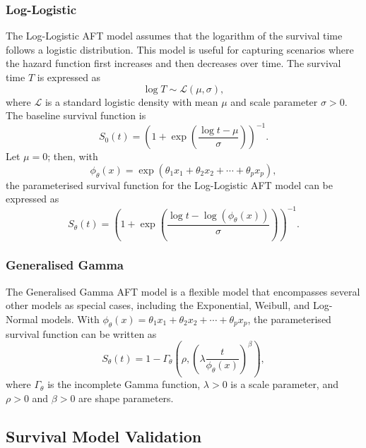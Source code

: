 
\subsubsection{Log-Logistic}
The Log-Logistic AFT model assumes that the logarithm of the survival time follows a logistic distribution. This model is useful for capturing scenarios where the hazard function first increases and then decreases over time. The survival time $T$ is expressed as
\[ %
    \log T \sim \mathcal{L}(\mu, \sigma),
\]
where $\mathcal{L}$ is a standard logistic density with mean $\mu$
and scale parameter $\sigma > 0$.  The baseline survival function is
\[ %
    S_0(t) = {\left(1 + \exp\left( \frac{\log t - \mu}{\sigma} \right)\right)} ^{-1}.
\]
Let $\mu=0$; then, with
\[
    \phi_\theta(x) = \exp(\theta_1 x_1 + \theta_2 x_2 + \cdots + \theta_p x_p),
\]
the parameterised survival function for the Log-Logistic AFT model can be expressed as
\[ %
    S_{\theta}(t) = {\left( 1 + \exp \left( \frac{\log t - \log(\phi_\theta(x))}{\sigma}\right) \right)}^{-1}.
\]


\subsubsection{Generalised Gamma}
The Generalised Gamma AFT model is a flexible model that encompasses several other models as special cases, including the Exponential, Weibull, and Log-Normal models.
With $\phi_{\theta}(x) = \theta_1 x_1 + \theta_2 x_2 + \cdots + \theta_p x_p$, the parameterised survival function can be written as
\[
    S_{\theta}(t) = 1 - \Gamma_{\theta}\left(\rho, {\left(\lambda \frac{t}{\phi_\theta(x)}\right)}^\beta\right),
\]
where $\Gamma_{\theta}$ is the incomplete Gamma function, $\lambda > 0$ is a scale parameter, and $\rho>0$ and $\beta > 0$ are shape parameters.



\subsection{Survival Model Validation}
\label{metrics}

